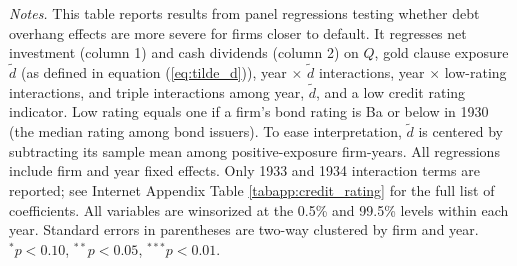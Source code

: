 \begin{table}[p]
    \vspace*{3mm} \justifying \noindent
\scriptsize{\textit{Notes.} This table reports results from panel regressions testing whether debt overhang effects are more severe for firms closer to default. It regresses net investment (column 1) and cash dividends (column 2) on $Q$, gold clause exposure $\tilde{d}$ (as defined in equation (\ref{eq:tilde_d})), year $\times$ $\tilde{d}$ interactions, year $\times$ low-rating interactions, and triple interactions among year, $\tilde{d}$, and a low credit rating indicator. Low rating equals one if a firm's bond rating is Ba or below in 1930 (the median rating among bond issuers). To ease interpretation, $\tilde{d}$ is centered by subtracting its sample mean among positive-exposure firm-years. All regressions include firm and year fixed effects. Only 1933 and 1934 interaction terms are reported; see Internet Appendix Table \ref{tabapp:credit_rating} for the full list of coefficients. All variables are winsorized at the 0.5\% and 99.5\% levels within each year. Standard errors in parentheses are two-way clustered by firm and year. $^{*}p<0.10$, $^{**}p<0.05$, $^{***}p<0.01$.}
\end{table}